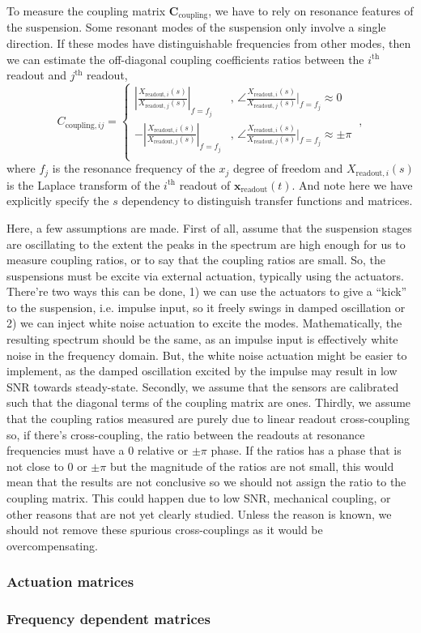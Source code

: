 To measure the coupling matrix $\mathbf{C}_\mathrm{coupling}$, we have to rely on resonance features of the suspension.
Some resonant modes of the suspension only involve a single direction.
If these modes have distinguishable frequencies from other modes, then we can estimate the off-diagonal coupling coefficients ratios between the $i^\mathrm{th}$ readout and $j^\mathrm{th}$ readout,
\begin{equation}
	\boxed{
		C_{\mathrm{coupling}, ij}=
		\begin{cases}
			\left\lvert\frac{X_{\mathrm{readout}, i}(s)}{X_{\mathrm{readout}, j}(s)}\right\rvert_{f=f_j} & ,\,\angle\frac{X_{\mathrm{readout}, i}(s)}{X_{\mathrm{readout}, j}(s)}\Big\vert_{f=f_j}\approx 0\\
			-\left\lvert\frac{X_{\mathrm{readout}, i}(s)}{X_{\mathrm{readout}, j}(s)}\right\rvert_{f=f_j} & ,\,\angle\frac{X_{\mathrm{readout}, i}(s)}{X_{\mathrm{readout}, j}(s)}\Big\rvert_{f=f_j}\approx \pm \pi\\
		\end{cases}
	}\ ,
\end{equation}
where $f_j$ is the resonance frequency of the $x_j$ degree of freedom and $X_{\mathrm{readout},i}(s)$ is the Laplace transform of the $i^\mathrm{th}$ readout of $\mathbf{x}_\mathrm{readout}(t)$.
And note here we have explicitly specify the $s$ dependency to distinguish transfer functions and matrices.

Here, a few assumptions are made.
First of all, assume that the suspension stages are oscillating to the extent the peaks in the spectrum are high enough for us to measure coupling ratios, or to say that the coupling ratios are small.
So, the suspensions must be excite via external actuation, typically using the actuators.
There're two ways this can be done, 1) we can use the actuators to give a ``kick'' to the suspension, i.e. impulse input, so it freely swings in damped oscillation or 2) we can inject white noise actuation to excite the modes.
Mathematically, the resulting spectrum should be the same, as an impulse input is effectively white noise in the frequency domain.
But, the white noise actuation might be easier to implement, as the damped oscillation excited by the impulse may result in low SNR towards steady-state.
Secondly, we assume that the sensors are calibrated such that the diagonal terms of the coupling matrix are ones.
Thirdly, we assume that the coupling ratios measured are purely due to linear readout cross-coupling so, if there's cross-coupling, the ratio between the readouts at resonance frequencies must have a 0 relative or $\pm \pi$ phase.
If the ratios has a phase that is not close to 0 or $\pm \pi$ but the magnitude of the ratios are not small, this would mean that the results are not conclusive so we should not assign the ratio to the coupling matrix.
This could happen due to low SNR, mechanical coupling, or other reasons that are not yet clearly studied.
Unless the reason is known, we should not remove these spurious cross-couplings as it would be overcompensating.

\subsubsection{Actuation matrices \label{sec:control_matrices_actuation_matrices}}

\subsubsection{Frequency dependent matrices \label{sec:control_matrices_frequency_dependent_matrices}}